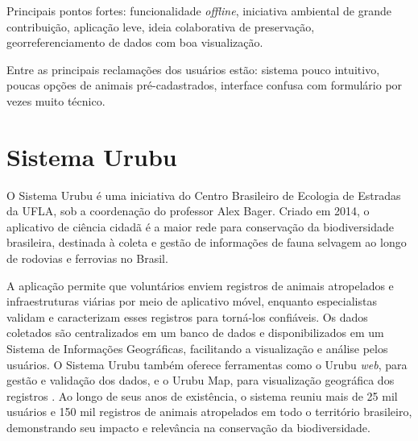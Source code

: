 Principais pontos fortes: funcionalidade \textit{offline}, iniciativa ambiental de grande contribuição, aplicação leve, ideia colaborativa de preservação, georreferenciamento de dados com boa visualização.

Entre as principais reclamações dos usuários estão: sistema pouco intuitivo, poucas opções de animais pré-cadastrados, interface confusa com formulário por vezes muito técnico.

\section{Sistema Urubu}\label{urubu}

O Sistema Urubu é uma iniciativa do Centro Brasileiro de Ecologia de Estradas da UFLA, sob a coordenação do professor Alex Bager. Criado em 2014, o aplicativo de ciência cidadã é a maior rede para conservação da biodiversidade brasileira, destinada à coleta e gestão de informações de fauna selvagem ao longo de rodovias e ferrovias no Brasil. 

A aplicação permite que voluntários enviem registros de animais atropelados e infraestruturas viárias por meio de aplicativo móvel, enquanto especialistas validam e caracterizam esses registros para torná-los confiáveis. Os dados coletados são centralizados em um banco de dados e disponibilizados em um Sistema de Informações Geográficas, facilitando a visualização e análise pelos usuários. O Sistema Urubu também oferece ferramentas como o Urubu \textit{web}, para gestão e validação dos dados, e o Urubu Map, para visualização geográfica dos registros \cite{castro2019sistema}. Ao longo de seus anos de existência, o sistema reuniu mais de 25 mil usuários e 150 mil registros de animais atropelados em todo o território brasileiro, demonstrando seu impacto e relevância na conservação da biodiversidade.

